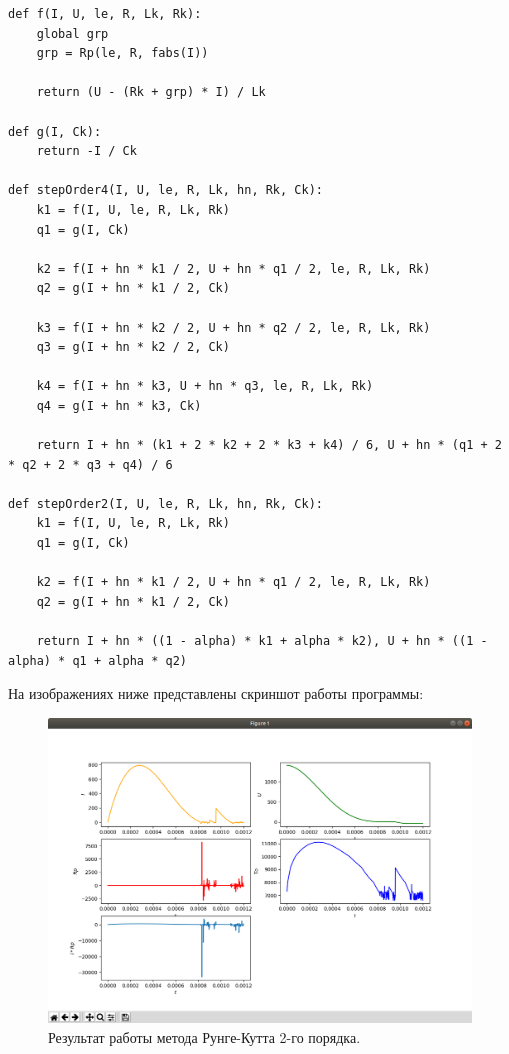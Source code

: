 \lstset{language=python}
\begin{lstlisting}[caption=Решение системы уравнений методом Рунге-Кутта 2-го и 4-го порядка]
def f(I, U, le, R, Lk, Rk):
    global grp
    grp = Rp(le, R, fabs(I))

    return (U - (Rk + grp) * I) / Lk

def g(I, Ck):
    return -I / Ck

def stepOrder4(I, U, le, R, Lk, hn, Rk, Ck):
    k1 = f(I, U, le, R, Lk, Rk)
    q1 = g(I, Ck)

    k2 = f(I + hn * k1 / 2, U + hn * q1 / 2, le, R, Lk, Rk)
    q2 = g(I + hn * k1 / 2, Ck)

    k3 = f(I + hn * k2 / 2, U + hn * q2 / 2, le, R, Lk, Rk)
    q3 = g(I + hn * k2 / 2, Ck)

    k4 = f(I + hn * k3, U + hn * q3, le, R, Lk, Rk)
    q4 = g(I + hn * k3, Ck)

    return I + hn * (k1 + 2 * k2 + 2 * k3 + k4) / 6, U + hn * (q1 + 2 * q2 + 2 * q3 + q4) / 6

def stepOrder2(I, U, le, R, Lk, hn, Rk, Ck):
    k1 = f(I, U, le, R, Lk, Rk)
    q1 = g(I, Ck)

    k2 = f(I + hn * k1 / 2, U + hn * q1 / 2, le, R, Lk, Rk)
    q2 = g(I + hn * k1 / 2, Ck)

    return I + hn * ((1 - alpha) * k1 + alpha * k2), U + hn * ((1 - alpha) * q1 + alpha * q2)
\end{lstlisting}

\newpage

На изображениях ниже представлены скриншот работы программы:
\begin{figure}[H]
    \centering
    \includegraphics[scale=0.4]{data/image/work.png}
    \caption{Результат работы метода Рунге-Кутта 2-го порядка.}
\end{figure}

